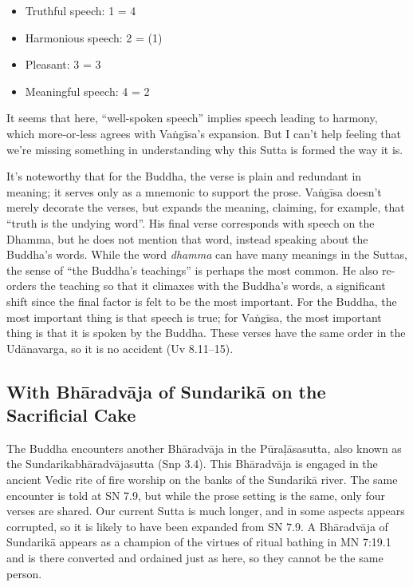 \documentclass[12pt,openany]{book}%
\begin{document}
\begin{itemize}%
\item Truthful speech: 1 = 4%
\item Harmonious speech: 2 = (1)%
\item Pleasant: 3 = 3%
\item Meaningful speech: 4 = 2%
\end{itemize}

It seems that here, “well-spoken speech” implies speech leading to harmony, which more-or-less agrees with \textsanskrit{Vaṅgīsa}’s expansion. But I can’t help feeling that we’re missing something in understanding why this Sutta is formed the way it is.

It’s noteworthy that for the Buddha, the verse is plain and redundant in meaning; it serves only as a mnemonic to support the prose. \textsanskrit{Vaṅgīsa} doesn’t merely decorate the verses, but expands the meaning, claiming, for example, that “truth is the undying word”. His final verse corresponds with speech on the Dhamma, but he does not mention that word, instead speaking about the Buddha’s words. While the word \textit{dhamma} can have many meanings in the Suttas, the sense of “the Buddha’s teachings” is perhaps the most common. He also re-orders the teaching so that it climaxes with the Buddha’s words, a significant shift since the final factor is felt to be the most important. For the Buddha, the most important thing is that speech is true; for \textsanskrit{Vaṅgīsa}, the most important thing is that it is spoken by the Buddha. These verses have the same order in the \textsanskrit{Udānavarga}, so it is no accident (Uv 8.11–15).

\subsection*{With \textsanskrit{Bhāradvāja} of \textsanskrit{Sundarikā} on the Sacrificial Cake}

The Buddha encounters another \textsanskrit{Bhāradvāja} in the \textsanskrit{Pūraḷāsasutta}, also known as the \textsanskrit{Sundarikabhāradvājasutta} (Snp 3.4). This \textsanskrit{Bhāradvāja} is engaged in the ancient Vedic rite of fire worship on the banks of the \textsanskrit{Sundarikā} river. The same encounter is told at SN 7.9, but while the prose setting is the same, only four verses are shared. Our current Sutta is much longer, and in some aspects appears corrupted, so it is likely to have been expanded from SN 7.9. A \textsanskrit{Bhāradvāja} of \textsanskrit{Sundarikā} appears as a champion of the virtues of ritual bathing in MN 7:19.1 and is there converted and ordained just as here, so they cannot be the same person.
\end{document}
